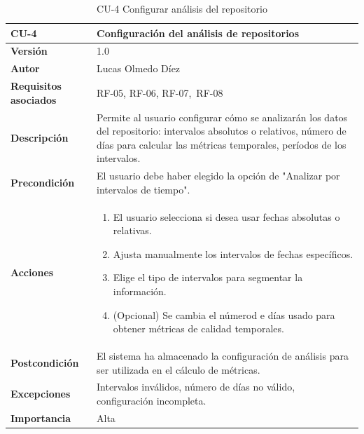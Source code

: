 \clearpage
\begin{table}[p]
    \centering
    \begin{tabularx}{\linewidth}{ p{} p{} }
        \toprule
        \textbf{CU-4} & Configuración del análisis de repositorios \\
        \midrule
        \textbf{Versión} & 1.0 \\
        \textbf{Autor} & Lucas Olmedo Díez \\
        \textbf{Requisitos asociados} & RF-05, RF-06, RF-07,\ RF-08 \\
        \textbf{Descripción} & Permite al usuario configurar cómo se analizarán los datos del repositorio: intervalos absolutos o relativos, número de días para calcular las métricas temporales, períodos de los intervalos. \\
        \textbf{Precondición} & El usuario debe haber elegido la opción de "Analizar por intervalos de tiempo". \\
        \textbf{Acciones} &
        \begin{enumerate}
            \def\labelenumi{\arabic{enumi}.}
            \tightlist
            \item El usuario selecciona si desea usar fechas absolutas o relativas.
            \item Ajusta manualmente los intervalos de fechas específicos.
            \item Elige el tipo de intervalos para segmentar la información.
            \item (Opcional) Se cambia el númerod e días usado para obtener métricas de calidad temporales.
        \end{enumerate}\\
        \textbf{Postcondición} & El sistema ha almacenado la configuración de análisis para ser utilizada en el cálculo de métricas. \\
        \textbf{Excepciones} & Intervalos inválidos, número de días no válido, configuración incompleta. \\
        \textbf{Importancia} & Alta \\
        \bottomrule
    \end{tabularx}
    \caption{CU-4 Configurar análisis del repositorio}
\end{table}

